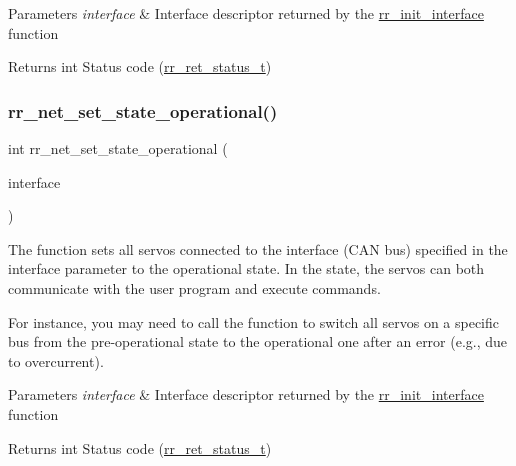 \begin{DoxyParams}{Parameters}
{\em interface} & Interface descriptor returned by the \hyperlink{group___common_ga472a4890dcc7d7a13123c56a06946d91}{rr\+\_\+init\+\_\+interface} function \\
\hline
\end{DoxyParams}
\begin{DoxyReturn}{Returns}
int Status code (\hyperlink{api_8h_a92d5be5038abcf89837faf85a08debdc}{rr\+\_\+ret\+\_\+status\+\_\+t}) 
\end{DoxyReturn}
\mbox{\label{group___system__control_ga427f81205fc35a78a351d1288ea67165}} 
\subsubsection{\texorpdfstring{rr\+\_\+net\+\_\+set\+\_\+state\+\_\+operational()}{rr\_net\_set\_state\_operational()}}
{\footnotesize\ttfamily int rr\+\_\+net\+\_\+set\+\_\+state\+\_\+operational (\begin{DoxyParamCaption}\item[{const \hyperlink{structrr__can__interface__t}{rr\+\_\+can\+\_\+interface\+\_\+t} $\ast$}]{interface }\end{DoxyParamCaption})}



The function sets all servos connected to the interface (C\+AN bus) specified in the \textquotesingle{}interface\textquotesingle{} parameter to the operational state. In the state, the servos can both communicate with the user program and execute commands. 

For instance, you may need to call the function to switch all servos on a specific bus from the pre-\/operational state to the operational one after an error (e.\+g., due to overcurrent).


\begin{DoxyParams}{Parameters}
{\em interface} & Interface descriptor returned by the \hyperlink{group___common_ga472a4890dcc7d7a13123c56a06946d91}{rr\+\_\+init\+\_\+interface} function \\
\hline
\end{DoxyParams}
\begin{DoxyReturn}{Returns}
int Status code (\hyperlink{api_8h_a92d5be5038abcf89837faf85a08debdc}{rr\+\_\+ret\+\_\+status\+\_\+t}) 
\end{DoxyReturn}
\mbox{\label{group___system__control_ga6a6c46f69a8586cf7bd129a55a775eb7}} 
